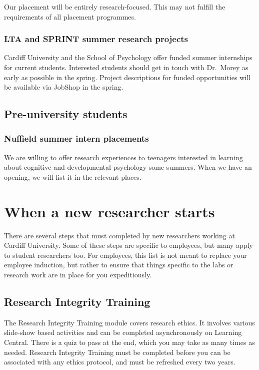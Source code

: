 \documentclass[
  12pt,
]{book}
\begin{document}
Our placement will be entirely research-focused. This may not fulfill the requirements of all placement programmes.

\subsection{LTA and SPRINT summer research projects}\label{lta-and-sprint-summer-research-projects}

Cardiff University and the School of Psychology offer funded summer internships for current students. Interested students should get in touch with Dr.~Morey as early as possible in the spring. Project descriptions for funded opportunities will be available via JobShop in the spring.

\section{Pre-university students}\label{pre-university-students}

\subsection{Nuffield summer intern placements}\label{nuffield-summer-intern-placements}

We are willing to offer research experiences to teenagers interested in learning about cognitive and developmental psychology some summers. When we have an opening, we will list it in the relevant places.

\chapter{When a new researcher starts}\label{when-a-new-researcher-starts}

There are several steps that must completed by new researchers working at Cardiff University. Some of these steps are specific to employees, but many apply to student researchers too. For employees, this list is not meant to replace your employee induction, but rather to ensure that things specific to the labs or research work are in place for you expeditiously.

\section{Research Integrity Training}\label{research-integrity-training}

The Research Integrity Training module covers research ethics. It involves various slide-show based activities and can be completed asynchronously on Learning Central. There is a quiz to pass at the end, which you may take as many times as needed. Research Integrity Training must be completed before you can be associated with any ethics protocol, and must be refreshed every two years.
\end{document}
